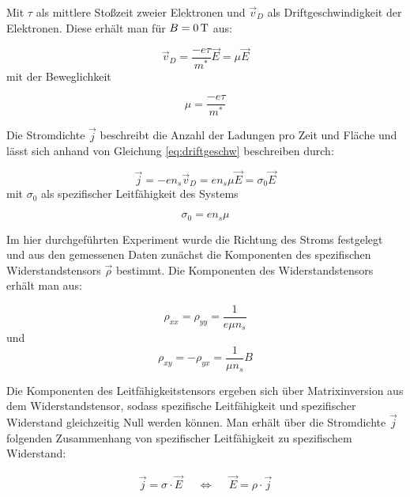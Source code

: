Mit $\tau$ als mittlere Stoßzeit zweier Elektronen und $\vec{v}_D$ als Driftgeschwindigkeit der Elektronen. Diese erhält man für $B=\unit[0]{T}$ aus:

\begin{equation}
\vec{v}_D=\frac{-e\tau}{m^*}\vec{E}=\mu\vec{E}
\label{eq:driftgeschw}
\end{equation}
mit der Beweglichkeit

\begin{equation}
\mu=\frac{-e\tau}{m^*}
\label{eq:bewegl_def}
\end{equation}

Die Stromdichte $\vec{j}$ beschreibt die Anzahl der Ladungen pro Zeit und Fläche und lässt sich anhand von Gleichung \ref{eq:driftgeschw} beschreiben durch:

\begin{equation}
\vec{j}=-en_s\vec{v}_D=en_s\mu\vec{E}=\sigma_0\vec{E}
\label{eq:stromdichte_herleitung}
\end{equation}
mit $\sigma_0$ als spezifischer Leitfähigkeit des Systems

\begin{equation}
\sigma_0=en_s\mu
\label{eq:sigma_def}
\end{equation}

Im hier durchgeführten Experiment wurde die Richtung des Stroms festgelegt und aus den gemessenen Daten zunächst die Komponenten des spezifischen Widerstandstensors $\vec{\rho}$ bestimmt. 
Die Komponenten des Widerstandstensors erhält man aus:

\begin{equation}
\rho_{xx}=\rho_{yy}=\frac{1}{e\mu n_s}
\label{eq:widerst_tensor_xx_yy}
\end{equation}
und
\begin{equation}
\rho_{xy}=-\rho_{yx}=\frac{1}{\mu n_s}B
\label{eq:widerst_tensor_xy_yx}
\end{equation}

Die Komponenten des Leitfähigkeitstensors ergeben sich über Matrixinversion aus dem Widerstandstensor, sodass spezifische Leitfähigkeit und spezifischer Widerstand gleichzeitig Null werden können. Man erhält über die Stromdichte $\vec{j}$ folgenden Zusammenhang von spezifischer Leitfähigkeit zu spezifischem Widerstand:

\begin{align}
	\vec{j} = \sigma \cdot \vec{E} & & \Leftrightarrow & & \vec{E} = \rho \cdot \vec{j}
	\label{eq:u2rho}
\end{align}

